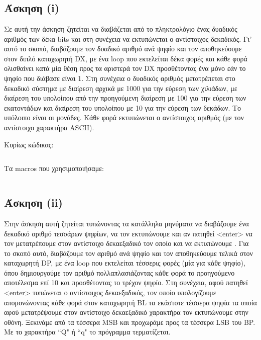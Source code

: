 \documentclass[a4paper,10pt]{article} \usepackage{anysize}
\begin{document}


\section*{} 
\subsection*{Άσκηση (i)}

Σε αυτή την άσκηση ζητείται να διαβάζεται από το πληκτρολόγιο ένας δυαδικός
αριθμός των δέκα bits και στη συνέχεια να εκτυπώνεται ο αντίστοιχος δεκαδικός.
Γι' αυτό το σκοπό, διαβάζουμε τον δυαδικό αριθμό ανά ψηφίο και τον
αποθηκεύουμε στον διπλό καταχωρητή DX, με ένα loop που εκτελείται δέκα φορές
και κάθε φορά ολισθαίνει κατά μία θέση προς τα αριστερά τον DX προσθέτοντας
ένα μόνο εάν το ψηφίο που διάβασε είναι 1. Στη συνέχεια ο δυαδικός αριθμός
μετατρέπεται στο δεκαδικό σύστημα με  διαίρεση αρχικά με 1000 για την εύρεση
των χιλιάδων, με διαίρεση του υπολοίπου από την προηγούμενη διαίρεση με 100
για την εύρεση των εκατοντάδων και διαίρεση του υπολοίπου με 10 για την εύρεση
των δεκάδων. Το υπόλοιπο είναι οι μονάδες. Κάθε φορά εκτυπώνεται ο αντίστοιχος
αριθμός (με τον αντίστοιχο χαρακτήρα ASCII).

\noindent Κυρίως κώδικας:
\inputminted[linenos,obeytabs,fontsize=\footnotesize]{nasm}{files/1.asm}
Τα macros που χρησιμοποιήσαμε:
\inputminted[linenos,obeytabs,fontsize=\footnotesize]{nasm}{files/1.txt}
\subsection*{Άσκηση (ii)}
Στην άσκηση αυτή ζητείται τυπώνοντας τα κατάλληλα μηνύματα να διαβάζουμε ένα
δεκαδικό αριθμό τεσσάρων ψηφίων, να τον εκτυπώνουμε και αν πατηθεί <enter> να
τον μετατρέπουμε στον αντίστοιχο δεκαεξαδικό τον οποίο και να εκτυπώνουμε .
Για το σκοπό αυτό, διαβάζουμε τον αριθμό ανά ψηφίο και τον αποθηκεύουμε τελικά
στον καταχωρητή DP, με ένα loop που εκτελείται τέσσερις φορές (μία για κάθε
ψηφίο), όπου δημιουργούμε τον αριθμό πολλαπλασιάζοντας κάθε φορά το
προηγούμενο αποτέλεσμα επί 10 και προσθέτοντας το τρέχον ψηφίο. Στη συνέχεια,
αφού πατηθεί <enter> τυπώνεται ο αντίστοιχος δεκαεξαδικός, τον οποίο
υπολογίζουμε απομονώνοντας κάθε φορά στον καταχωρητή BL τα εκάστοτε τέσσερα
ψηφία τα οποία αφού μετατρέψουμε στον αντίστοιχο δεκαεξαδικό χαρακτήρα τον
εκτυπώνουμε στην οθόνη. Ξεκινάμε από τα τέσσερα MSB και προχωράμε προς τα
τέσσερα LSB του BP.  Με το χαρακτήρα ``Q" ή ``q" το πρόγραμμα τερματίζεται.
\end{document}
